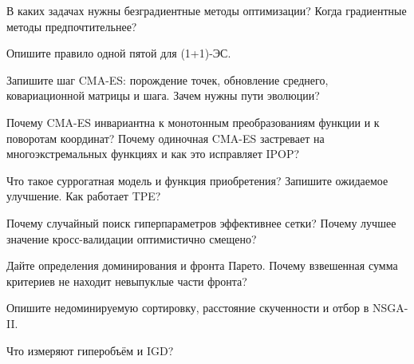 \begin{questions}
\item В каких задачах нужны безградиентные методы оптимизации? Когда градиентные методы предпочтительнее?
\item Опишите правило одной пятой для (1+1)-ЭС.
\item Запишите шаг CMA-ES: порождение точек, обновление среднего, ковариационной матрицы и шага. Зачем
нужны пути эволюции?
\item Почему CMA-ES инвариантна к монотонным преобразованиям функции и к поворотам координат? Почему
одиночная CMA-ES застревает на многоэкстремальных функциях и как это исправляет IPOP?
\item Что такое суррогатная модель и функция приобретения? Запишите ожидаемое улучшение. Как работает TPE?
\item Почему случайный поиск гиперпараметров эффективнее сетки? Почему лучшее значение кросс-валидации
оптимистично смещено?
\item Дайте определения доминирования и фронта Парето. Почему взвешенная сумма критериев не находит
невыпуклые части фронта?
\item Опишите недоминируемую сортировку, расстояние скученности и отбор в NSGA-II.
\item Что измеряют гиперобъём и IGD?
\end{questions}
